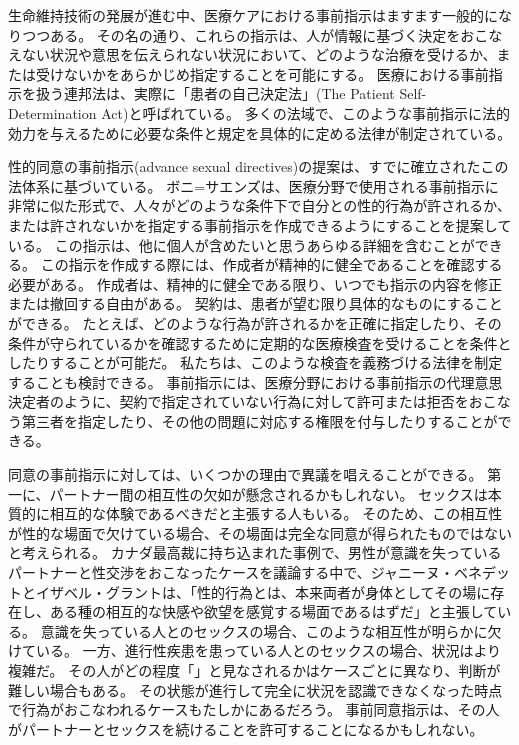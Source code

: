 \documentclass[paper=a4,book,openany]{jlreq}
\begin{document}
生命維持技術の発展が進む中、医療ケアにおける事前指示はますます一般的になりつつある。
その名の通り、これらの指示は、人が情報に基づく決定をおこなえない状況や意思を伝えられない状況において、どのような治療を受けるか、または受けないかをあらかじめ指定することを可能にする。
医療における事前指示を扱う連邦法は、実際に「患者の自己決定法」(The Patient Self-Determination Act)と呼ばれている。
多くの法域で、このような事前指示に法的効力を与えるために必要な条件と規定を具体的に定める法律が制定されている\citep[cf.][]{srebnik99:_advan_direc_mental_healt_treat}。

性的同意の事前指示(advance sexual directives)の提案は、すでに確立されたこの法体系に基づいている。
ボニ=サエンズは、医療分野で使用される事前指示に非常に似た形式で、人々がどのような条件下で自分との性的行為が許されるか、または許されないかを指定する事前指示を作成できるようにすることを提案している\citep{boni-saenz15:_sexual_incap}。
この指示は、他に個人が含めたいと思うあらゆる詳細を含むことができる。
この指示を作成する際には、作成者が精神的に健全であることを確認する必要がある。
作成者は、精神的に健全である限り、いつでも指示の内容を修正または撤回する自由がある。
契約は、患者が望む限り具体的なものにすることができる。
たとえば、どのような行為が許されるかを正確に指定したり、その条件が守られているかを確認するために定期的な医療検査を受けることを条件としたりすることが可能だ。
私たちは、このような検査を義務づける法律を制定することも検討できる。
事前指示には、医療分野における事前指示の代理意思決定者のように、契約で指定されていない行為に対して許可または拒否をおこなう第三者を指定したり、その他の問題に対応する権限を付与したりすることができる。

同意の事前指示に対しては、いくつかの理由で異議を唱えることができる。
第一に、パートナー間の相互性の欠如が懸念されるかもしれない。
セックスは本質的に相互的な体験であるべきだと主張する人もいる。
そのため、この相互性が性的な場面で欠けている場合、その場面は完全な同意が得られたものではないと考えられる。
カナダ最高裁に持ち込まれた事例で、男性が意識を失っているパートナーと性交渉をおこなったケースを議論する中で、ジャニーヌ・ベネデットとイザベル・グラントは、「性的行為とは、本来両者が身体としてその場に存在し、ある種の相互的な快感や欲望を感覚する場面であるはずだ」と主張している\citep[p.80]{benedet10:confusing}。
意識を失っている人とのセックスの場合、このような相互性が明らかに欠けている。
一方、進行性疾患を患っている人とのセックスの場合、状況はより複雑だ。
その人がどの程度「」と見なされるかはケースごとに異なり、判断が難しい場合もある。
その状態が進行して完全に状況を認識できなくなった時点で行為がおこなわれるケースもたしかにあるだろう。
事前同意指示は、その人がパートナーとセックスを続けることを許可することになるかもしれない。
\end{document}
